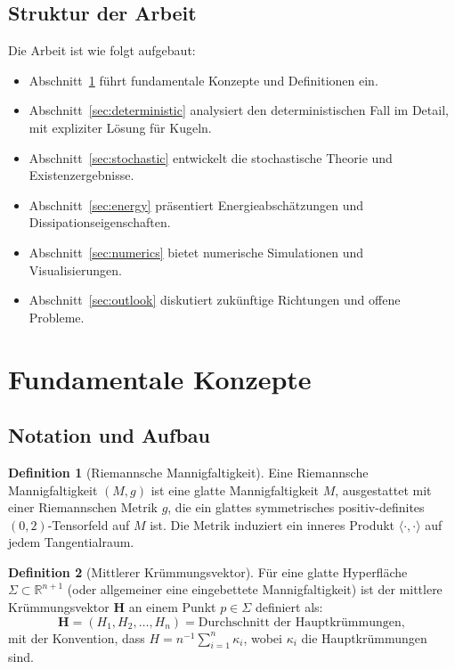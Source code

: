 \documentclass[a4paper,12pt]{article}
\theoremstyle{definition}
\newtheorem{definition}{Definition}
\begin{document}
\subsection{Struktur der Arbeit}

Die Arbeit ist wie folgt aufgebaut:
\begin{itemize}
	\item Abschnitt~\ref{sec:fundamentals} führt fundamentale Konzepte und Definitionen ein.
	\item Abschnitt~\ref{sec:deterministic} analysiert den deterministischen Fall im Detail, mit expliziter Lösung für Kugeln.
	\item Abschnitt~\ref{sec:stochastic} entwickelt die stochastische Theorie und Existenzergebnisse.
	\item Abschnitt~\ref{sec:energy} präsentiert Energieabschätzungen und Dissipationseigenschaften.
	\item Abschnitt~\ref{sec:numerics} bietet numerische Simulationen und Visualisierungen.
	\item Abschnitt~\ref{sec:outlook} diskutiert zukünftige Richtungen und offene Probleme.
\end{itemize}

\section{Fundamentale Konzepte}
\label{sec:fundamentals}

\subsection{Notation und Aufbau}

\begin{definition}[Riemannsche Mannigfaltigkeit]
	Eine Riemannsche Mannigfaltigkeit $(M, g)$ ist eine glatte Mannigfaltigkeit $M$, ausgestattet mit einer Riemannschen Metrik $g$, die ein glattes symmetrisches positiv-definites $(0,2)$-Tensorfeld auf $M$ ist. Die Metrik induziert ein inneres Produkt $\langle \cdot, \cdot \rangle$ auf jedem Tangentialraum.
\end{definition}

\begin{definition}[Mittlerer Krümmungsvektor]
	Für eine glatte Hyperfläche $\Sigma \subset \mathbb{R}^{n+1}$ (oder allgemeiner eine eingebettete Mannigfaltigkeit) ist der mittlere Krümmungsvektor $\mathbf{H}$ an einem Punkt $p \in \Sigma$ definiert als:
	\[
	\mathbf{H} = (H_1, H_2, \ldots, H_n) = \text{Durchschnitt der Hauptkrümmungen},
	\]
	mit der Konvention, dass $H = n^{-1} \sum_{i=1}^n \kappa_i$, wobei $\kappa_i$ die Hauptkrümmungen sind.
\end{definition}
\end{document}
